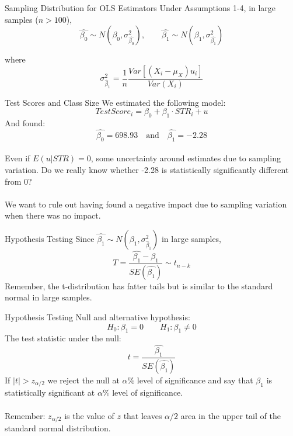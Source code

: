 \documentclass{./../div_teaching_slides}
\begin{document}
\begin{frame}{Sampling Distribution for OLS Estimators}
Under Assumptions 1-4, in large samples ($n>100$), 
 $$ \hat{\beta_0} \sim N(\beta_0, \sigma^2_{\hat{\beta_0}}), \quad \quad  \hat{\beta_1} \sim N(\beta_1, \sigma^2_{\hat{\beta_1}}) $$
 
 where $$ \sigma^2_{\hat{\beta}_1} = \frac{1}{n} \frac{Var[(X_i-\mu_X)u_i]}{Var(X_i)} $$	
\end{frame}

\begin{frame}{Test Scores and Class Size}
We estimated the following model:
$$ Test Score_i = \beta_0 + \beta_1 \cdot STR_i + u $$
And found:
$$ \hat{\beta_0} =698.93 \quad \text{and} \quad \hat{\beta_1}=-2.28   $$ \\
\vspace{1em}
Even if $E(u|STR)=0$, some uncertainty around estimates due to sampling variation. Do we really know whether -2.28 is statistically significantly different from 0? \\~\\
We want to rule out having found a negative impact due to sampling variation when there was no impact.
\end{frame}

\begin{frame}{Hypothesis Testing}
Since $ \hat{\beta_1} \sim N(\beta_1, \sigma^2_{\hat{\beta}_1})$ in large samples,
$$ T = \frac{\hat{\beta_1}-\beta_1}{SE({\hat{\beta_1}})} \sim t_{n-k} $$
Remember, the t-distribution has fatter tails but is similar to the standard normal in large samples. 
\end{frame}

\begin{frame}{Hypothesis Testing}
Null and alternative hypothesis:
$$ H_0: \beta_1 = 0 \quad \quad H_1: \beta_1 \neq 0 $$ 
The test statistic under the null: 
$$ t = \frac{\hat{\beta_1}}{SE(\hat{\beta_1})} $$
If $|t|>z_{\alpha/2}$ we reject the null at $\alpha \%$ level of significance and say that $\beta_1$ is statistically significant at $\alpha \%$ level of significance. \\~\\
Remember: $z_{\alpha/2}$ is the value of $z$ that leaves $\alpha/2$ area in the upper tail of the standard normal distribution.
\end{frame}
\end{document}
